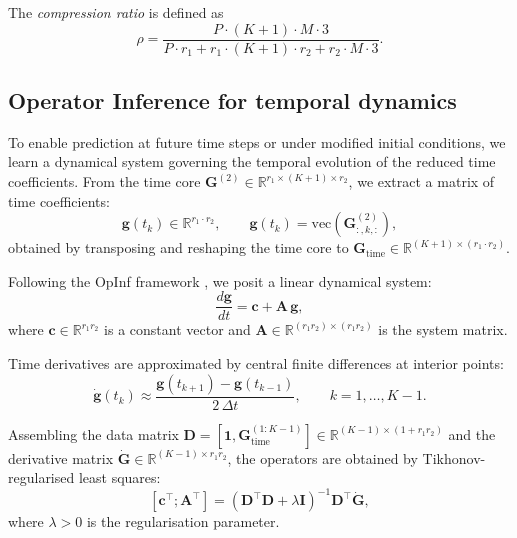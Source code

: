 \documentclass[12pt]{article}
\newcommand{\R}{\mathbb{R}}
\newcommand{\mat}[1]{\mathbf{#1}}
\newcommand{\vect}[1]{\mathbf{#1}}
\newcommand{\dt}{\Delta t}
\begin{document}
The \emph{compression ratio} is defined as
\begin{equation}
    \rho = \frac{P \cdot (K+1) \cdot M \cdot 3}{P \cdot r_1 + r_1 \cdot (K+1) \cdot r_2 + r_2 \cdot M \cdot 3}.
\end{equation}

\subsection{Operator Inference for temporal dynamics}
\label{sec:opinf}

To enable prediction at future time steps or under modified initial conditions, we learn a dynamical system governing the temporal evolution of the reduced time coefficients.
From the time core $\mat{G}^{(2)} \in \R^{r_1 \times (K+1) \times r_2}$, we extract a matrix of time coefficients:
\begin{equation}
    \vect{g}(t_k) \in \R^{r_1 \cdot r_2}, \qquad
    \vect{g}(t_k) = \text{vec}\!\left(\mat{G}^{(2)}_{:,k,:}\right),
\end{equation}
obtained by transposing and reshaping the time core to $\mat{G}_{\text{time}} \in \R^{(K+1) \times (r_1 \cdot r_2)}$.

Following the OpInf framework \citep{Peherstorfer2016}, we posit a linear dynamical system:
\begin{equation}
\label{eq:opinf}
    \frac{d\vect{g}}{dt} = \vect{c} + \mat{A}\,\vect{g},
\end{equation}
where $\vect{c} \in \R^{r_1 r_2}$ is a constant vector and $\mat{A} \in \R^{(r_1 r_2) \times (r_1 r_2)}$ is the system matrix.

Time derivatives are approximated by central finite differences at interior points:
\begin{equation}
    \dot{\vect{g}}(t_k) \approx \frac{\vect{g}(t_{k+1}) - \vect{g}(t_{k-1})}{2\,\dt}, \qquad k = 1, \dots, K-1.
\end{equation}

Assembling the data matrix $\mat{D} = [\vect{1}, \mat{G}_{\text{time}}^{(1:K-1)}] \in \R^{(K-1) \times (1 + r_1 r_2)}$ and the derivative matrix $\dot{\mat{G}} \in \R^{(K-1) \times r_1 r_2}$, the operators are obtained by Tikhonov-regularised least squares:
\begin{equation}
\label{eq:opinf_solve}
    [\vect{c}^\top; \mat{A}^\top] = \left(\mat{D}^\top \mat{D} + \lambda \mat{I}\right)^{-1} \mat{D}^\top \dot{\mat{G}},
\end{equation}
where $\lambda > 0$ is the regularisation parameter.
\end{document}

